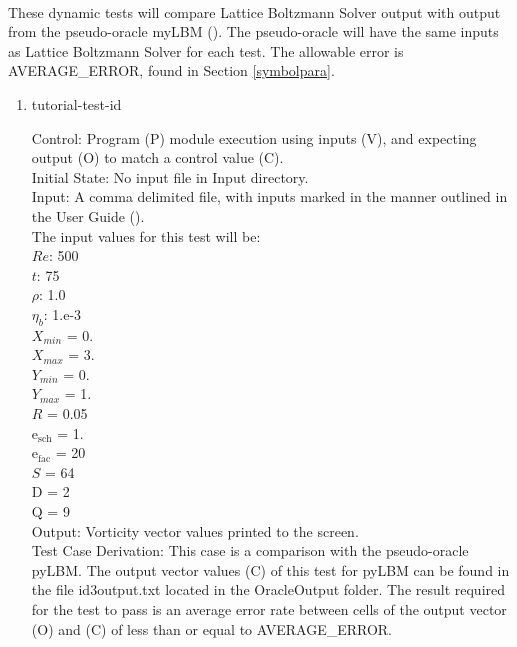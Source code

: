 \documentclass[12pt, titlepage]{article}
\newcommand{\famname}{Lattice Boltzmann Solver}
\newcounter{testcounter} %
\begin{document}
\paragraph{} These dynamic tests will compare {\famname} output with output from
the pseudo-oracle myLBM (\citet{pylbmcode}). The pseudo-oracle will have the
same inputs as {\famname} for each test. The allowable error is AVERAGE\_ERROR,
found in Section \ref{symbolpara}.

\begin{enumerate}

\item{tutorial-test-id\thetestcounter \\}

Control: Program (P) module execution using inputs (V), and expecting output (O)
to match a control value (C).\\
					
Initial State: No input file in Input directory.\\
					
Input: A comma delimited file, with inputs marked in the manner outlined in the
User Guide (\citet{LBM_UserGuide_PM}).\\The input values for this test will
be:\\
$Re$: 500\\
$t$: 75\\
$\rho$: 1.0\\
$\eta_b$: 1.e-3\\
$X_{min}$ = 0.\\
$X_{max}$ = 3.\\
$Y_{min}$ = 0.\\
$Y_{max}$ = 1.\\
$R$ = 0.05\\
$\mathrm{e_{sch}}$ = 1.\\
$\mathrm{e_{fac}}$ = 20\\
$S$ = 64\\
$\mathrm{D}$ = 2\\
$\mathrm{Q}$ = 9\\
	
Output: Vorticity vector values printed to the screen. \\

Test Case Derivation: This case is a comparison with the pseudo-oracle
pyLBM. The output vector values (C) of this test for pyLBM can be found in the
file id3output.txt located in the OracleOutput folder. The result required for
the test to pass is an average error rate between cells of the output vector (O)
and (C) of less than or equal to AVERAGE\_ERROR.\\


\end{enumerate}
\end{document}
